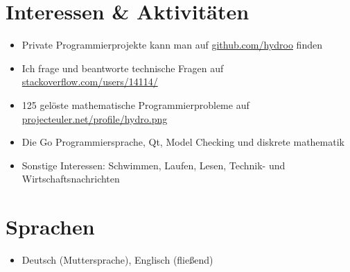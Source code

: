 \vspace{0.66cm} %

\customhrule
\section*{Interessen \& Aktivit\"aten}
\begin{itemize}
	\item Private Programmierprojekte kann man auf \href{https://github.com/hydroo}{github.com/hydroo} finden
	\item Ich frage und beantworte technische Fragen auf \href{http://stackoverflow.com/users/14114/}{stackoverflow.com/users/14114/}
	\item 125 gel\"oste mathematische Programmierprobleme auf \href{http://projecteuler.net/profile/hydro.png}{projecteuler.net/profile/hydro.png}
	\item Die Go Programmiersprache, Qt, Model Checking und diskrete mathematik
	\item Sonstige Interessen: Schwimmen, Laufen, Lesen, Technik- und Wirtschaftsnachrichten
\end{itemize}

\customhrule
\section*{Sprachen}
\begin{itemize}
	\item Deutsch (Muttersprache), Englisch (flie\ss end)
\end{itemize}



